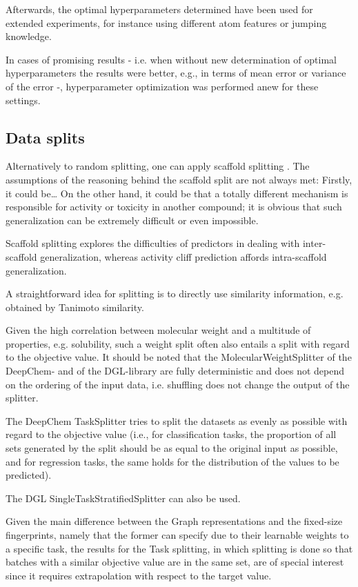 Afterwards, the optimal hyperparameters determined have been used for extended experiments, for instance using different atom features or jumping knowledge.

In cases of promising results - i.e. when without new determination of optimal hyperparameters the results were better, e.g., in terms of mean error or variance of the error -, hyperparameter optimization was performed anew for these settings.





\subsection{Data splits}

Alternatively to random splitting, one can apply scaffold splitting \cite{Bemis.1996}.
The assumptions of the reasoning behind the scaffold split are not always met: Firstly, it could be…
On the other hand, it could be that a totally different mechanism is responsible for activity or toxicity in another compound; it is obvious that such generalization can be extremely difficult or even impossible. 

Scaffold splitting explores the difficulties of predictors in dealing with inter-scaffold generalization, whereas activity cliff prediction affords intra-scaffold generalization. \cite{Deng.2023}

A straightforward idea for splitting is to directly use similarity information, e.g. obtained by Tanimoto similarity.


Given the high correlation between molecular weight and a multitude of properties, e.g. solubility, such a weight split often also entails a split with regard to the objective value.
It should be noted that the MolecularWeightSplitter of the DeepChem- and of the DGL-library are fully deterministic and does not depend on the ordering of the input data, i.e. shuffling does not change the output of the splitter. 

The DeepChem TaskSplitter tries to split the datasets as evenly as possible with regard to the objective value (i.e., for classification tasks, the proportion of all sets generated by the split should be as equal to the original input as possible, and for regression tasks, the same holds for the distribution of the values to be predicted).

The DGL SingleTaskStratifiedSplitter can also be used.


Given the main difference between the Graph representations and the fixed-size fingerprints, namely that the former can specify due to their learnable weights to a specific task, the results for the Task splitting, in which splitting is done so that batches with a similar objective value are in the same set, are of special interest since it requires extrapolation with respect to the target value.

